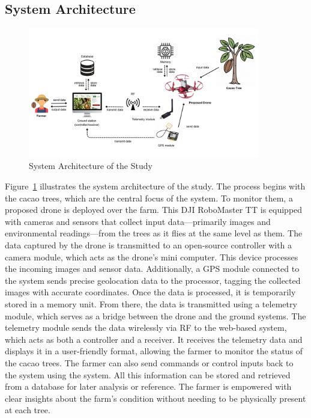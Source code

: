 \subsection*{System Architecture}

\begin{figure}[H]
	\centering
	\caption{System Architecture of the Study}
	\label{fig:SysArch}
	\includegraphics[width=0.9\textwidth]{figures/Sys_Arch.pdf}
\end{figure}

Figure~\ref{fig:SysArch} illustrates the system architecture of the study. The process begins with the cacao trees, which are the central focus of the system. To monitor them, a proposed drone is deployed over the farm. This DJI RoboMaster TT is equipped with cameras and sensors that collect input data—primarily images and environmental readings—from the trees as it flies at the same level as them. The data captured by the drone is transmitted to an open-source controller with a camera module, which acts as the drone’s mini computer. This device processes the incoming images and sensor data. Additionally, a GPS module connected to the system sends precise geolocation data to the processor, tagging the collected images with accurate coordinates. Once the data is processed, it is temporarily stored in a memory unit. From there, the data is transmitted using a telemetry module, which serves as a bridge between the drone and the ground systems. The telemetry module sends the data wirelessly via RF to the web-based system, which acts as both a controller and a receiver. It receives the telemetry data and displays it in a user-friendly format, allowing the farmer to monitor the status of the cacao trees. The farmer can also send commands or control inputs back to the system using the system. All this information can be stored and retrieved from a database for later analysis or reference. The farmer is empowered with clear insights about the farm’s condition without needing to be physically present at each tree.

